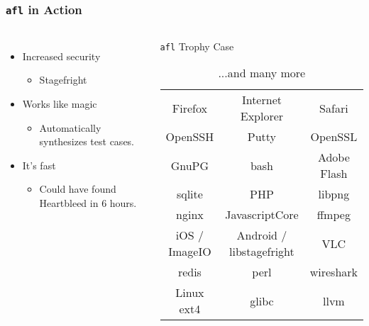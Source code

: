 \begin{frame}
\frametitle{\texttt{afl} in Action}

\begin{columns}


\begin{itemize}
\item{Increased security}
\begin{itemize}
\item{Stagefright}
\end{itemize}
\item{Works like magic}
\begin{itemize}
\item{Automatically synthesizes test cases.}
\end{itemize}
\item{It's fast}
\begin{itemize}
\item{Could have found Heartbleed in 6 hours.}
\end{itemize}

\end{itemize}


\begin{center}
\begin{table}
\caption{\texttt{afl} Trophy Case}
\tiny
\begin{tabular}{c | c | c}
Firefox & Internet Explorer & Safari \\
OpenSSH & Putty & OpenSSL \\
GnuPG & bash & Adobe Flash \\
sqlite & PHP & libpng \\
nginx & JavascriptCore & ffmpeg \\
iOS / ImageIO & Android / libstagefright & VLC \\
redis & perl & wireshark \\
Linux ext4 & glibc & llvm \\
\end{tabular}
\caption*{...and many more}
\end{table}
\end{center}

\end{columns}
\end{frame}
